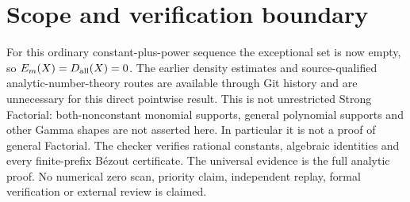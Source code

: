 \documentclass[11pt]{article}
\begin{document}
\section{Scope and verification boundary}
For this ordinary constant-plus-power sequence the exceptional set is now
empty, so $E_m(X)=D_{\rm all}(X)=0$. The earlier density estimates and
source-qualified analytic-number-theory routes are available through Git
history and are unnecessary for this direct pointwise result.
This is not unrestricted Strong Factorial: both-nonconstant monomial
supports, general polynomial supports and other Gamma shapes are not
asserted here. In particular it is not a proof of general Factorial.
The checker verifies rational constants, algebraic identities and every
finite-prefix B\'ezout certificate. The universal evidence is the full
analytic proof. No numerical zero scan, priority claim, independent replay,
formal verification or external review is claimed.
\end{document}
